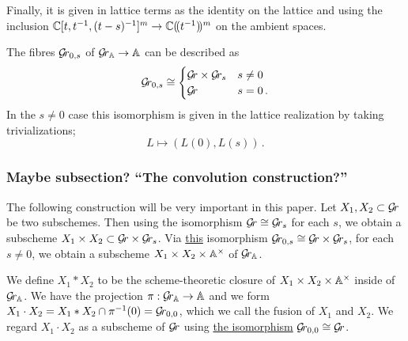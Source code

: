 \documentclass[draft]{article}
\begin{document}
Finally, it is given in lattice terms as the identity on the lattice and using the inclusion $\CC[t, t^{-1}, (t-s)^{-1}]^m \rightarrow \CC\xT[t^{-1}]^m$ on the ambient spaces.

The fibres $ \Gr_{0,s}$ of $ \Grbd \rightarrow \AA$ can be described as %
$$
\Gr_{0,s} \cong 
\begin{cases} 
    \Gr \times \Gr_s & s \ne 0 \\
    \Gr              & s = 0\,.
\end{cases}
$$
In the $s\ne 0$ case this isomorphism is given in the lattice realization  by taking trivializations; 
$$
L \mapsto (L(0), L(s))\,.
$$

\subsubsection{Maybe subsection? ``The convolution construction?''}
The following construction will be very important in this paper.  Let $ X_1, X_2 \subset \Gr$ be two subschemes. Then using the isomorphism $ \Gr \cong \Gr_s $ for each $ s $, we obtain a subscheme $ X_1 \times X_2 \subset \Gr \times \Gr_s $.  
Via \ul{this}  isomorphism $ \Gr_{0,s} \cong \Gr \times \Gr_s $,  for each $ s \ne 0$, we obtain a subscheme $ X_1 \times X_2 \times \AA^\times $  of $\Grbd$.  

We define $ X_1 * X_2 $ to be the scheme-theoretic closure of $ X_1 \times X_2 \times \AA^\times $ inside of $ \Grbd $.  We have the projection $ \pi: \Grbd \rightarrow \AA $ and we form $ X_1 \cdot X_2 = X_1 * X_2 \cap \pi^{-1}(0) = \Gr_{0,0} $, which we call the fusion of $ X_1 $ and $X_2$.  We regard $ X_1 \cdot X_2$ as a subscheme of $ \Gr $ using \ul{the isomorphism} $\Gr_{0,0} \cong \Gr $. 


\end{document}
